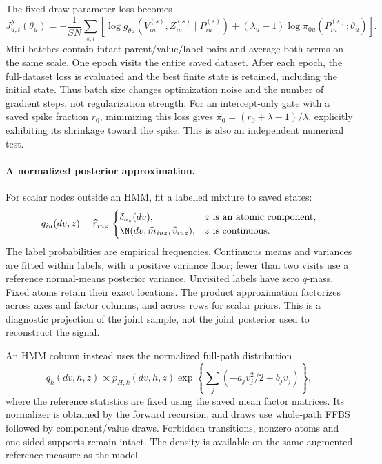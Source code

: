 The fixed-draw parameter loss becomes
\begin{equation}
J^\lambda_{u,t}(\theta_u)=-\frac{1}{SN}\sum_{s,i}
\left[\log g_{\theta u}(V_{iu}^{(s)},Z_{iu}^{(s)}\mid P_{iu}^{(s)})
+(\lambda_u-1)\log\pi_{0u}(P_{iu}^{(s)};\theta_u)\right].
\end{equation}
Mini-batches contain intact parent/value/label pairs and average both terms
on the same scale. One epoch visits the entire saved dataset. After each
epoch, the full-dataset loss is evaluated and the best finite state is
retained, including the initial state. Thus batch size changes optimization
noise and the number of gradient steps, not regularization strength.
For an intercept-only gate with a saved spike fraction \(r_0\), minimizing
this loss gives
\(\widehat\pi_0=(r_0+\lambda-1)/\lambda\), explicitly exhibiting its
shrinkage toward the spike. This is also an independent numerical test.

\paragraph{A normalized posterior approximation.}
For scalar nodes outside an HMM, fit a labelled mixture to saved states:
\[
q_{iu}(dv,z)=\widehat r_{iuz}\,
\begin{cases}
\delta_{a_z}(dv),&z\text{ is an atomic component},\\
\N(dv;\widehat m_{iuz},\widehat v_{iuz}),&z\text{ is continuous}.
\end{cases}
\]
The label probabilities are empirical frequencies. Continuous means and
variances are fitted within labels, with a positive variance floor; fewer
than two visits use a reference normal-means posterior variance. Unvisited
labels have zero \(q\)-mass. Fixed atoms retain their exact locations.
The product approximation factorizes across axes and factor columns, and
across rows for scalar priors. This is a diagnostic projection of the
joint sample, not the joint posterior used to reconstruct the signal.

An HMM column instead uses the normalized full-path distribution
\[
q_k(dv,h,z)\propto p_{H,k}(dv,h,z)
\exp\left\{\sum_j(-a_jv_j^2/2+b_jv_j)\right\},
\]
where the reference statistics are fixed using the saved mean factor
matrices. Its normalizer is obtained by the forward recursion, and draws
use whole-path FFBS followed by component/value draws. Forbidden transitions,
nonzero atoms and one-sided supports remain intact. The density is available
on the same augmented reference measure as the model.


